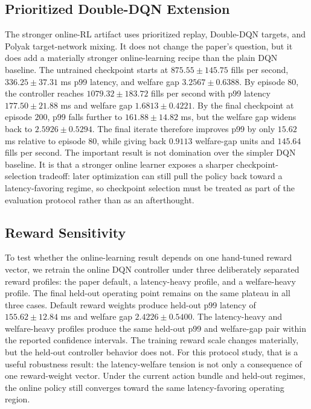 \documentclass[11pt]{article}
\begin{document}
\subsection{Prioritized Double-DQN Extension}
The stronger online-RL artifact uses prioritized replay, Double-DQN targets, and Polyak target-network mixing. It does not change the paper's question, but it does add a materially stronger online-learning recipe than the plain DQN baseline. The untrained checkpoint starts at $875.55 \pm 145.75$ fills per second, $336.25 \pm 37.31$ ms p99 latency, and welfare gap $3.2567 \pm 0.6388$. By episode $80$, the controller reaches $1079.32 \pm 183.72$ fills per second with p99 latency $177.50 \pm 21.88$ ms and welfare gap $1.6813 \pm 0.4221$. By the final checkpoint at episode $200$, p99 falls further to $161.88 \pm 14.82$ ms, but the welfare gap widens back to $2.5926 \pm 0.5294$. The final iterate therefore improves p99 by only $15.62$ ms relative to episode $80$, while giving back $0.9113$ welfare-gap units and $145.64$ fills per second. The important result is not domination over the simpler DQN baseline. It is that a stronger online learner exposes a sharper checkpoint-selection tradeoff: later optimization can still pull the policy back toward a latency-favoring regime, so checkpoint selection must be treated as part of the evaluation protocol rather than as an afterthought.

\subsection{Reward Sensitivity}
To test whether the online-learning result depends on one hand-tuned reward vector, we retrain the online DQN controller under three deliberately separated reward profiles: the paper default, a latency-heavy profile, and a welfare-heavy profile. The final held-out operating point remains on the same plateau in all three cases. Default reward weights produce held-out p99 latency of $155.62 \pm 12.84$ ms and welfare gap $2.4226 \pm 0.5400$. The latency-heavy and welfare-heavy profiles produce the same held-out p99 and welfare-gap pair within the reported confidence intervals. The training reward scale changes materially, but the held-out controller behavior does not. For this protocol study, that is a useful robustness result: the latency-welfare tension is not only a consequence of one reward-weight vector. Under the current action bundle and held-out regimes, the online policy still converges toward the same latency-favoring operating region.
\end{document}
